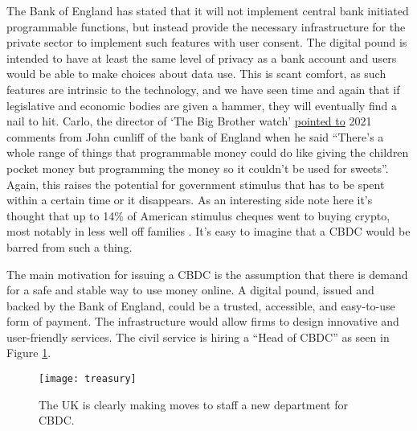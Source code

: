 The Bank of England has stated that it will not implement central bank initiated programmable functions, but instead provide the necessary infrastructure for the private sector to implement such features with user consent. The digital pound is intended to have at least the same level of privacy as a bank account and users would be able to make choices about data use. This is scant comfort, as such features are intrinsic to the technology, and we have seen time and again that if legislative and economic bodies are given a hammer, they will eventually find a nail to hit. Carlo, the director of `The Big Brother watch' \href{https://twitter.com/silkiecarlo/status/1622912736102346752}{pointed to} 2021 comments from John cunliff of the bank of England when he said ``There’s a whole range of things that programmable money could do like giving the children pocket money but programming the money so it couldn’t be used for sweets''. Again, this raises the potential for government stimulus that has to be spent within a certain time or it disappears. As an interesting side note here it's thought that up to 14\% of American stimulus cheques went to buying crypto, most notably in less well off families \cite{bertomeu2023uncle}. It's easy to imagine that a CBDC would be barred from such a thing.\par 
The main motivation for issuing a CBDC is the assumption that there is demand for a safe and stable way to use money online. A digital pound, issued and backed by the Bank of England, could be a trusted, accessible, and easy-to-use form of payment. The infrastructure would allow firms to design innovative and user-friendly services. The civil service is hiring a ``Head of CBDC'' as seen in Figure \ref{fig:treasury}.
\begin{figure}
  \centering
    \texttt{[image: treasury]}
  \caption{The UK is clearly making moves to staff a new department for CBDC.}
  \label{fig:treasury}
\end{figure}


